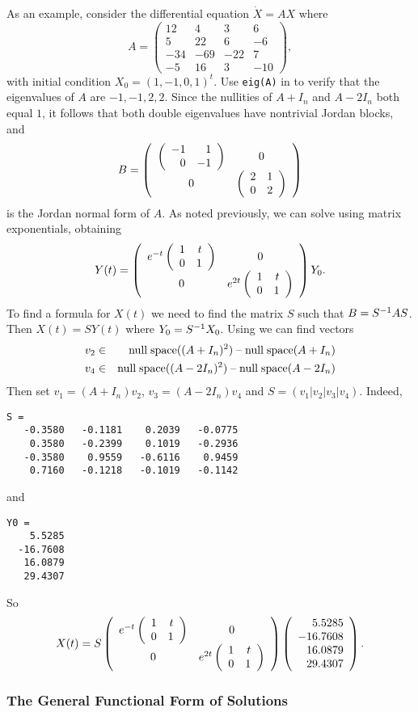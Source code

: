 As an example, consider the differential equation $\dot{X}=AX$ where
\begin{equation*}
A = \left(\begin{array}{rrrr} 12 & 4 & 3 & 6 \\ 5 & 22 & 6 & -6\\
-34 & -69 & -22 & 7\\ -5 & 16 & 3 & -10 \end{array}\right),
\end{equation*}
with initial condition $X_0=(1,-1,0,1)^t$.  Use {\tt eig(A)} in \Matlab to 
verify that the eigenvalues of $A$ are $-1,-1,2,2$.  Since the nullities of 
$A+I_n$ and $A-2I_n$ both equal $1$, it follows that both double eigenvalues
have nontrivial Jordan blocks, and
\[
B = \left(\begin{array}{cc} \left(\begin{array}{rr} -1 & 1\\ 0 &-1\end{array}\right) & 0\\ 0 &\left(\begin{array}{rr} 2 & 1\\ 0 &2\end{array}\right)\end{array}\right)
\]
is the Jordan normal form of $A$.  As noted previously, we can solve 
 using matrix exponentials, obtaining
\[
Y(t) =
\left(\begin{array}{cc} e^{-t}\left(\begin{array}{rr} 1 & t\\ 0 &1\end{array}\right) & 0\\ 0 &e^{2t}\left(\begin{array}{rr} 1 & t\\ 0 &1\end{array}\right)\end{array}\right)Y_0.
\]
To find a formula for $X(t)$ we need to find the matrix $S$ such that 
$B=S^{-1} AS$.  Then $X(t)=SY(t)$ where $Y_0=S^{-1} X_0$.  Using \Matlab we
can find vectors 
\begin{eqnarray*}
v_2 & \in & {\rm null\;space}((A+I_n)^2)\;\mbox{--}\;{\rm null\;space}(A+I_n) \\
v_4 & \in & {\rm null\;space}((A-2I_n)^2)\;\mbox{--}\;{\rm null\;space}(A-2I_n)
\end{eqnarray*}
Then set $v_1=(A+I_n)v_2$, $v_3=(A-2I_n)v_4$ and $S=(v_1|v_2|v_3|v_4)$. 
Indeed, 
\begin{verbatim}
S =
   -0.3580   -0.1181    0.2039   -0.0775
    0.3580   -0.2399    0.1019   -0.2936
   -0.3580    0.9559   -0.6116    0.9459
    0.7160   -0.1218   -0.1019   -0.1142
\end{verbatim}
and 
\begin{verbatim}
Y0 =
    5.5285
  -16.7608
   16.0879
   29.4307
\end{verbatim}
So 
\begin{equation}  \label{E:solvedebf}
X(t) = S\left(\begin{array}{cc} e^{-t}\left(\begin{array}{rr} 1 & t\\ 0 &1\end{array}\right) & 0\\ 0 &e^{2t}\left(\begin{array}{rr} 1 & t\\ 0 &1\end{array}\right)\end{array}\right)
\left(\begin{array}{r} 5.5285 \\  -16.7608 \\ 16.0879 \\ 29.4307\end{array}
\right).
\end{equation}

\subsubsection*{The General Functional Form of Solutions}

